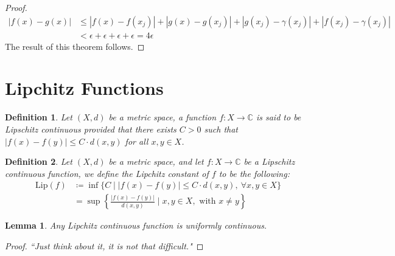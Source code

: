 \documentclass[11pt]{book}
\theoremstyle{break}
\theoremstyle{break}
\newtheorem{lem}{Lemma}[thm]
\newtheorem{defn}{Definition}[corL]
\newcommand{\C}{\mathbb{C}}
\begin{document}
\begin{proof}
\begin{align*}
|f(x) - g(x) | &\leq |f(x) - f(x_j) | + |g(x) - g(x_j)| + |g(x_j) - \gamma(x_j) | + | f(x_j) - \gamma(x_j)|\\
&< \epsilon+ \epsilon + \epsilon + \epsilon  = 4\epsilon
\end{align*}
The result of this theorem follows. 
\end{proof}


\newpage
\section[Lipchitz Functions]{\color{red}Lipchitz Functions\color{black}}
\begin{defn}
Let $(X,d)$ be a metric space, a function $f:X \to \C$ is said to be Lipschitz continuous provided that there exists $C > 0$ such that $|f(x) - f(y)| \leq C\cdot d(x,y)$ for all $x,y \in X$. 
\end{defn}

\begin{defn}
Let $(X,d)$ be a metric space, and let $f:X \to \C$ be a Lipschitz continuous function, we define the Lipchitz constant of $f$ to be the following:
\begin{align*}
\text{Lip}(f) &\coloneqq \inf\{ C \mid |f(x) - f(y) | \leq C\cdot d(x,y), \ \forall x,y \in X\} \\
&= \sup\left\{\frac{|f(x) - f(y)|}{d(x,y)}\mid x,y \in X, \text{ with }x\neq y\right\}
\end{align*}
\end{defn}

\begin{lem}
Any Lipchitz continuous function is uniformly continuous.
\end{lem}
\begin{proof}
\textit{``Just think about it, it is not that difficult."}
\end{proof}
\end{document}
